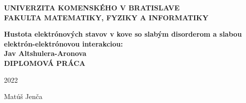 \thispagestyle{empty}
\begin{center}
{\large \bf UNIVERZITA KOMENSKÉHO V BRATISLAVE \\
FAKULTA MATEMATIKY, FYZIKY A INFORMATIKY}
\end{center}
%

\vspace{2cm}

\vspace{1cm}
\begin{center}
{\large \bf Hustota elektrónových stavov v kove so slabým disorderom a slabou elektrón-elektrónovou interakciou:\\ Jav Altshulera-Aronova\\
\vspace{3cm}
DIPLOMOVÁ PRÁCA}
\end{center}

\vfill
%
\begin{multicols}{2}
{\bf
\begin{flushleft} 2022 \end{flushleft}
\begin{flushright} Matúš Jenča \end{flushright} 
}
\end{multicols}
